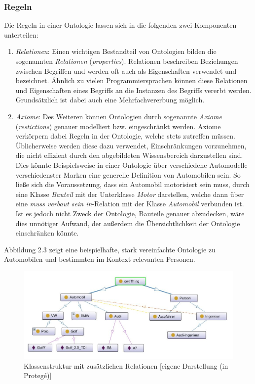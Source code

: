 \documentclass[12pt]{report}
\begin{document}
\subsubsection{Regeln}
Die Regeln in einer Ontologie lassen sich in die folgenden zwei Komponenten unterteilen:
\begin{enumerate}
\item \textit{Relationen}: Einen wichtigen Bestandteil von Ontologien bilden die sogenannten \textit{Relationen} (\textit{properties}).
Relationen beschreiben Beziehungen zwischen Begriffen und werden oft auch als Eigenschaften verwendet und bezeichnet. Ähnlich zu vielen Programmiersprachen können diese Relationen und Eigenschaften eines Begriffs an die Instanzen des Begriffs vererbt werden. Grundsätzlich ist dabei auch eine Mehrfachvererbung möglich. 

\item \textit{Axiome}: Des Weiteren können Ontologien durch sogenannte \textit{Axiome} (\textit{restictions})  genauer modelliert bzw. eingeschränkt werden. Axiome verkörpern dabei Regeln in der Ontologie, welche stets zutreffen müssen. Üblicherweise werden diese dazu verwendet, Einschränkungen vorzunehmen, die nicht effizient durch den abgebildeten Wissensbereich darzustellen sind. Dies könnte Beispielsweise in einer Ontologie über verschiedene Automodelle verschiedenster Marken eine generelle Definition von Automobilen sein. 
So ließe sich die Voraussetzung, dass ein Automobil motorisiert sein muss, durch eine Klasse \textit{Bauteil} mit der Unterklasse \textit{Motor} darstellen, welche dann über eine \textit{muss verbaut sein in}-Relation mit der Klasse \textit{Automobil} verbunden ist. Ist es jedoch nicht Zweck der Ontologie, Bauteile genauer abzudecken, wäre dies unnötiger Aufwand, der außerdem die Übersichtlichkeit der Ontologie einschränken könnte.
\end{enumerate}

Abbildung 2.3 zeigt eine beispielhafte, stark vereinfachte Ontologie zu Automobilen und bestimmten im Kontext relevanten Personen. 

\begin{figure}[H]
\begin{center}
\includegraphics[scale=0.8]{Bilder/ontologyRelations.jpg}
\caption{Klassenstruktur mit zusätzlichen Relationen [eigene Darstellung (in Protegé)]}
\end{center}
\end{figure}
\end{document}
